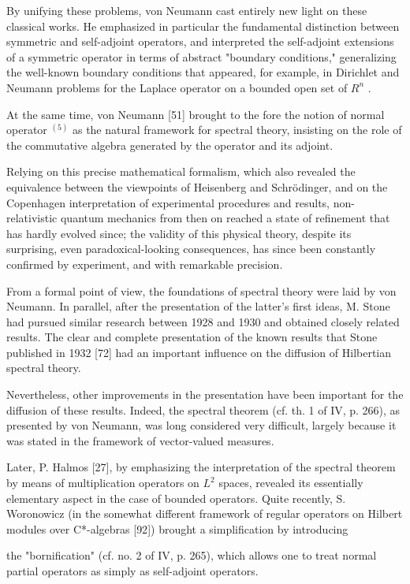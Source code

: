 By unifying these problems, von Neumann cast entirely new light on these classical works. He emphasized in particular the fundamental distinction between symmetric and self-adjoint operators, and interpreted the self-adjoint extensions of a symmetric operator in terms of abstract "boundary conditions," generalizing the well-known boundary conditions that appeared, for example, in Dirichlet and Neumann problems for the Laplace operator on a bounded open set of \(R^{n}\) .

At the same time, von Neumann {[}51{]} brought to the fore the notion of normal operator \(^{(5)}\) as the natural framework for spectral theory, insisting on the role of the commutative algebra generated by the operator and its adjoint.

Relying on this precise mathematical formalism, which also revealed the equivalence between the viewpoints of Heisenberg and Schrödinger, and on the Copenhagen interpretation of experimental procedures and results, non-relativistic quantum mechanics from then on reached a state of refinement that has hardly evolved since; the validity of this physical theory, despite its surprising, even paradoxical-looking consequences, has since been constantly confirmed by experiment, and with remarkable precision.

From a formal point of view, the foundations of spectral theory were laid by von Neumann. In parallel, after the presentation of the latter's first ideas, M. Stone had pursued similar research between 1928 and 1930 and obtained closely related results. The clear and complete presentation of the known results that Stone published in 1932 {[}72{]} had an important influence on the diffusion of Hilbertian spectral theory.

Nevertheless, other improvements in the presentation have been important for the diffusion of these results. Indeed, the spectral theorem (cf. th. 1 of IV, p. 266), as presented by von Neumann, was long considered very difficult, largely because it was stated in the framework of vector-valued measures.

Later, P. Halmos {[}27{]}, by emphasizing the interpretation of the spectral theorem by means of multiplication operators on \(L^{2}\) spaces, revealed its essentially elementary aspect in the case of bounded operators. Quite recently, S. Woronowicz (in the somewhat different framework of regular operators on Hilbert modules over C*-algebras {[}92{]}) brought a simplification by introducing

the "bornification" (cf. no. 2 of IV, p. 265), which allows one to treat normal partial operators as simply as self-adjoint operators.

